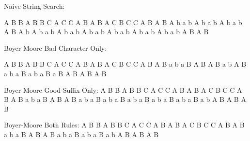 
Naive String Search:

	A B B A B B C A C C A B A B A C B C C A B A B
	A b a b                                      
	  A b a b                                     
	    A b a b                                   
    	  A B A b                                 
    	    A b a b                                
    	      A b a b                              
    	        A b a b                             
   	        	  A b a b                               
   	        	    A b a b                              
   	        	      A b a b                           
   	        	        A B A B                     
   	        	         	        	        

Boyer-Moore Bad Character Only:

	A B B A B B C A C C A B A B A C B C C A B A B
	a b a B                                        
	  A B A B                                 
	    a b A B                 
	      a b a B
	      		  a b a B
	                a B A B
	                    A B A B
	                       
Boyer-Moore Good Suffix Only:
	A B B A B B C A C C A B A B A C B C C A B A B
	a b a B                                       
	  A B A B
	      a b a B
	        a b a B
	          a b a B          
	            a b a B       
	              a b a B
	                a b A B
	                    A B A B  
	                       
Boyer-Moore Both Rules:
	A B B A B B C A C C A B A B A C B C C A B A B
	a b a B
      A B A B
          a b a B
		          a b a B		
		            a b A B                   
                        A B A B